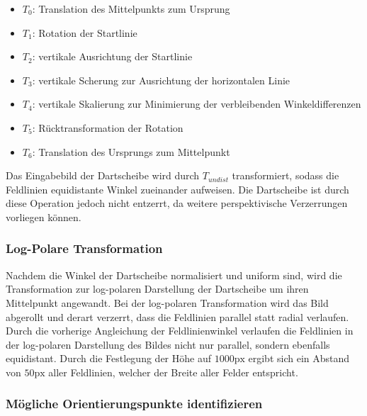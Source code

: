 \begin{itemize}
    \item $T_0$: Translation des Mittelpunkts zum Ursprung
    \item $T_1$: Rotation der Startlinie
    \item $T_2$: vertikale Ausrichtung der Startlinie
    \item $T_3$: vertikale Scherung zur Ausrichtung der horizontalen Linie
    \item $T_4$: vertikale Skalierung zur Minimierung der verbleibenden Winkeldifferenzen
    \item $T_5$: Rücktransformation der Rotation
    \item $T_6$: Translation des Ursprungs zum Mittelpunkt
\end{itemize}

Das Eingabebild der Dartscheibe wird durch $T_{undist}$ transformiert, sodass die Feldlinien equidistante Winkel zueinander aufweisen. Die Dartscheibe ist durch diese Operation jedoch nicht entzerrt, da weitere perspektivische Verzerrungen vorliegen können.

\subsubsection{Log-Polare Transformation}
\label{sec:impl:cv:orient:logpolar}

Nachdem die Winkel der Dartscheibe normalisiert und uniform sind, wird die Transformation zur log-polaren Darstellung der Dartscheibe um ihren Mittelpunkt angewandt. Bei der log-polaren Transformation wird das Bild abgerollt und derart verzerrt, dass die Feldlinien parallel statt radial verlaufen. Durch die vorherige Angleichung der Feldlinienwinkel verlaufen die Feldlinien in der log-polaren Darstellung des Bildes nicht nur parallel, sondern ebenfalls equidistant. Durch die Festlegung der Höhe auf $1000\text{px}$ ergibt sich ein Abstand von $50\text{px}$ aller Feldlinien, welcher der Breite aller Felder entspricht.

\subsubsection{Mögliche Orientierungspunkte identifizieren}
\label{sec:impl:cv:orient:points}

